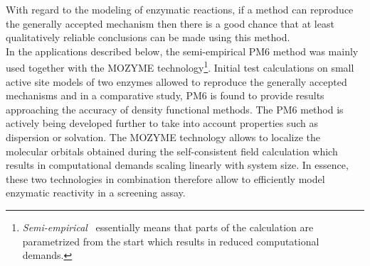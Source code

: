 With regard to the modeling of enzymatic reactions, if a method can reproduce the generally accepted mechanism then there is a good chance that at least qualitatively reliable conclusions can be made using this method.\\
In the applications described below, the semi-empirical PM6 method\cite{stewart2007optimization, stewart2009application} was mainly used together with the MOZYME technology\cite{stewart1996application}\footnote{\textit{Semi-empirical } essentially means that parts of the calculation are parametrized from the start which results in reduced computational demands.}.
Initial test calculations on small active site models of two enzymes allowed to reproduce the generally accepted mechanisms and in a comparative study, PM6 is found to provide results approaching the accuracy of density functional methods\cite{schenker2011assessment}.
The PM6 method is actively being developed further to take into account properties such as dispersion or solvation\cite{rezac2009semiempirical, vrezavc2011halogen}.
The MOZYME technology allows to localize the molecular orbitals obtained during the self-consistent field calculation which results in computational demands scaling linearly with system size.
In essence, these two technologies in combination therefore allow to efficiently model enzymatic reactivity in a screening assay.


